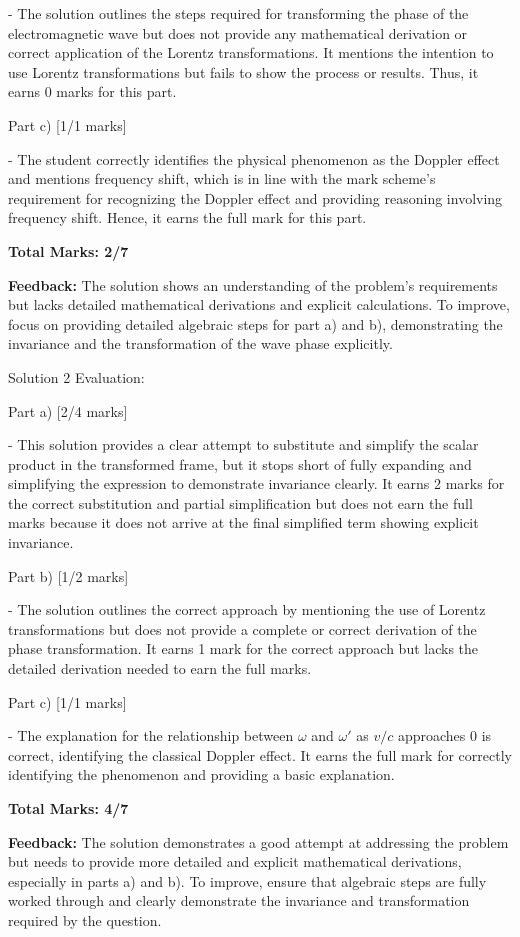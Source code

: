 \documentclass[a4paper,11pt]{article}
\begin{document}
- The solution outlines the steps required for transforming the phase of the electromagnetic wave but does not provide any mathematical derivation or correct application of the Lorentz transformations. It mentions the intention to use Lorentz transformations but fails to show the process or results. Thus, it earns 0 marks for this part.

Part c) [1/1 marks]

- The student correctly identifies the physical phenomenon as the Doppler effect and mentions frequency shift, which is in line with the mark scheme's requirement for recognizing the Doppler effect and providing reasoning involving frequency shift. Hence, it earns the full mark for this part.

\textbf{Total Marks: 2/7}

\textbf{Feedback:} The solution shows an understanding of the problem's requirements but lacks detailed mathematical derivations and explicit calculations. To improve, focus on providing detailed algebraic steps for part a) and b), demonstrating the invariance and the transformation of the wave phase explicitly.

Solution 2 Evaluation:

Part a) [2/4 marks]

- This solution provides a clear attempt to substitute and simplify the scalar product in the transformed frame, but it stops short of fully expanding and simplifying the expression to demonstrate invariance clearly. It earns 2 marks for the correct substitution and partial simplification but does not earn the full marks because it does not arrive at the final simplified term showing explicit invariance.

Part b) [1/2 marks]

- The solution outlines the correct approach by mentioning the use of Lorentz transformations but does not provide a complete or correct derivation of the phase transformation. It earns 1 mark for the correct approach but lacks the detailed derivation needed to earn the full marks.

Part c) [1/1 marks]

- The explanation for the relationship between \( \omega \) and \( \omega' \) as \( v/c \) approaches \( 0 \) is correct, identifying the classical Doppler effect. It earns the full mark for correctly identifying the phenomenon and providing a basic explanation.

\textbf{Total Marks: 4/7}

\textbf{Feedback:} The solution demonstrates a good attempt at addressing the problem but needs to provide more detailed and explicit mathematical derivations, especially in parts a) and b). To improve, ensure that algebraic steps are fully worked through and clearly demonstrate the invariance and transformation required by the question.
\end{document}
